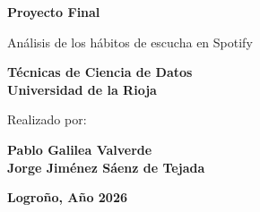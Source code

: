 \begin{titlepage}
    \begin{center}
        \vspace*{-1in}

        \begin{Huge}
            \textbf{Proyecto Final\\}
        \end{Huge}
        \vspace*{0.1in}
        \begin{huge}
            Análisis de los hábitos de escucha en Spotify\\
        \end{huge}

        \vspace*{0.4in}
        \begin{tcolorbox}[colback=white]
            \begin{Huge}
                \begin{center}
                    \textbf{Técnicas de Ciencia de Datos\\Universidad de la Rioja}
                \end{center}
            \end{Huge}
        \end{tcolorbox}

        \vspace*{0.3in}
        \begin{large}
            Realizado por:\\
        \end{large}
        \vspace*{0.1in}
        \begin{Large}
            \textbf{Pablo Galilea Valverde\\}
            \textbf{Jorge Jiménez Sáenz de Tejada\\}
        \end{Large}

        \vspace*{0.1in}

        \vspace*{0.8in}
        \textbf{Logroño, Año 2026}

    \end{center}

\end{titlepage}
